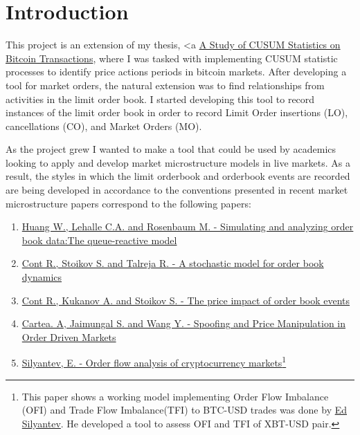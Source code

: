 \section{Introduction} 
This project is an extension of my thesis, <a \href{"https://academicworks.cuny.edu/cgi/viewcontent.cgi?article=1682&context=hc_sas_etds"}{ A Study of CUSUM Statistics on Bitcoin Transactions}, where I was tasked with implementing CUSUM statistic processes to identify price actions periods in bitcoin markets. After developing a tool for market orders, the natural extension was to find relationships from activities in the limit order book. I started developing this tool to record instances of the limit order book in order to record Limit Order insertions (LO), cancellations (CO), and Market Orders (MO).

As the project grew I wanted to make a tool that could be used by academics looking to apply and develop market microstructure models in live markets. As a result, the styles in which the limit orderbook and orderbook events are recorded are being developed in accordance to the conventions presented in recent market microstructure papers correspond to the following papers:
\begin{enumerate}
	\item \href{https://arxiv.org/pdf/1312.0563.pdf}{Huang W., Lehalle C.A. and Rosenbaum M. - Simulating and analyzing order book data:The queue-reactive model}\cite{Huang:2020}
	\item \href{https://citeseerx.ist.psu.edu/viewdoc/download?doi=10.1.1.139.1085&rep=rep1&type=pdf}{Cont R., Stoikov S. and Talreja R. - A stochastic model for order book dynamics}
	
	\item \href{https://arxiv.org/pdf/1011.6402.pdf}{Cont R., Kukanov A. and Stoikov S. - The price impact of order book events}
	
	\item \href{https://papers.ssrn.com/sol3/papers.cfm?abstract_id=3431139}{Cartea. A, Jaimungal S. and Wang Y. - Spoofing and Price Manipulation in Order Driven Markets}
	
	\item \href{https://link.springer.com/article/10.1007/s42521-019-00007-w#article-info}{Silyantev, E. - Order flow analysis of cryptocurrency markets}\footnote{This paper shows a working model implementing Order Flow Imbalance (OFI) and Trade Flow Imbalance(TFI) to BTC-USD trades was done by \href{https://medium.com/@eliquinox/order-flow-analysis-of-cryptocurrency-markets-b479a0216ad8}{Ed Silyantev}. He developed a tool to assess OFI and TFI of XBT-USD pair. }
\end{enumerate}

